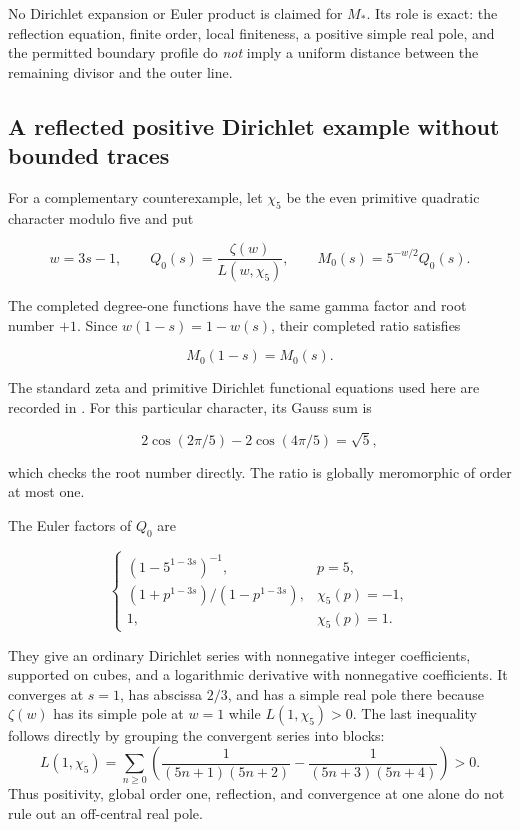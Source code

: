 No Dirichlet expansion or Euler product is claimed for \(M_*\). Its role is exact: the reflection equation, finite order, local finiteness, a positive simple real pole, and the permitted boundary profile do \emph{not} imply a uniform distance between the remaining divisor and the outer line.

\subsection{A reflected positive Dirichlet example without bounded traces}

For a complementary counterexample, let \(\chi_5\) be the even primitive quadratic character modulo five and put

\begin{equation}\label{eq:ob7-1}
w=3s-1,\qquad
Q_0(s)=\frac{\zeta(w)}{L(w,\chi_5)},\qquad
M_0(s)=5^{-w/2}Q_0(s).
\end{equation}

The completed degree-one functions have the same gamma factor and root number \(+1\). Since \(w(1-s)=1-w(s)\), their completed ratio satisfies

\begin{equation}\label{eq:ob7-2}
M_0(1-s)=M_0(s).
\end{equation}

The standard zeta and primitive Dirichlet functional equations used here are recorded in \citet[\S\S25.4 and 25.15, equations 25.4.1 and 25.15.5]{dlmf}. For this particular character, its Gauss sum is

\begin{equation}\label{eq:ob7-3}
2\cos(2\pi/5)-2\cos(4\pi/5)=\sqrt5,
\end{equation}

which checks the root number directly. The ratio is globally meromorphic of order at most one.

The Euler factors of \(Q_0\) are

\begin{equation}\label{eq:ob7-4}
\begin{cases}
(1-5^{1-3s})^{-1},&p=5,\\
(1+p^{1-3s})/(1-p^{1-3s}),&\chi_5(p)=-1,\\
1,&\chi_5(p)=1.
\end{cases}
\end{equation}

They give an ordinary Dirichlet series with nonnegative integer coefficients, supported on cubes, and a logarithmic derivative with nonnegative coefficients. It converges at \(s=1\), has abscissa \(2/3\), and has a simple real pole there because \(\zeta(w)\) has its simple pole at \(w=1\) while \(L(1,\chi_5)>0\). The last inequality follows directly by grouping the convergent series into blocks:
\[
L(1,\chi_5)=\sum_{n\ge0}
\left(\frac1{(5n+1)(5n+2)}
-\frac1{(5n+3)(5n+4)}\right)>0.
\]
Thus positivity, global order one, reflection, and convergence at one alone do not rule out an off-central real pole.

